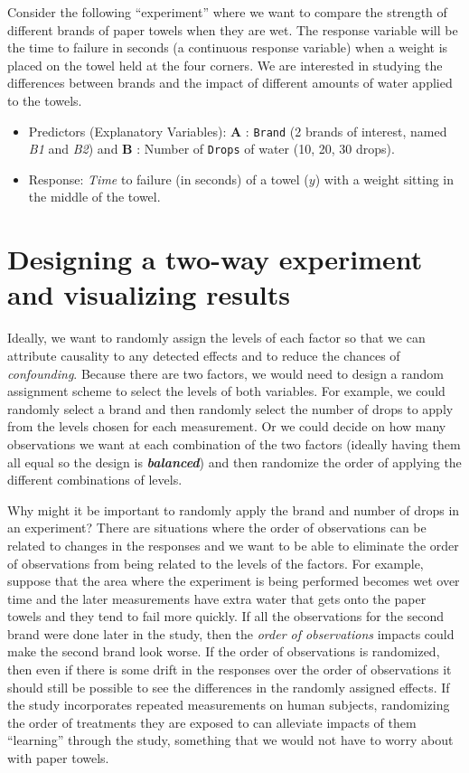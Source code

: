 \documentclass[]{book}
\theoremstyle{definition}
\theoremstyle{definition}
\theoremstyle{remark}
\begin{document}
Consider the following ``experiment'' where we want to compare the
strength of different brands of paper towels when they are wet. The
response variable will be the time to failure in seconds (a continuous
response variable) when a weight is placed on the towel held at the four
corners. We are interested in studying the differences between brands
and the impact of different amounts of water applied to the towels.

\begin{itemize}
\item
  Predictors (Explanatory Variables): \textbf{A} : \texttt{Brand} (2
  brands of interest, named \emph{B1} and \emph{B2}) and \textbf{B} :
  Number of \texttt{Drops} of water (10, 20, 30 drops).
\item
  Response: \emph{Time} to failure (in seconds) of a towel (\(y\)) with
  a weight sitting in the middle of the towel.
\end{itemize}

\section{Designing a two-way experiment and visualizing
results}\label{section4-2}

Ideally, we want to randomly assign the levels of each factor so that we
can attribute causality to any detected effects and to reduce the
chances of \emph{confounding}. Because there are two factors, we would
need to design a random assignment scheme to select the levels of both
variables. For example, we could randomly select a brand and then
randomly select the number of drops to apply from the levels chosen for
each measurement. Or we could decide on how many observations we want at
each combination of the two factors (ideally having them all equal so
the design is \textbf{\emph{balanced}}) and then randomize the order of
applying the different combinations of levels.

Why might it be important to randomly apply the brand and number of
drops in an experiment? There are situations where the order of
observations can be related to changes in the responses and we want to
be able to eliminate the order of observations from being related to the
levels of the factors. For example, suppose that the area where the
experiment is being performed becomes wet over time and the later
measurements have extra water that gets onto the paper towels and they
tend to fail more quickly. If all the observations for the second brand
were done later in the study, then the \emph{order of observations}
impacts could make the second brand look worse. If the order of
observations is randomized, then even if there is some drift in the
responses over the order of observations it should still be possible to
see the differences in the randomly assigned effects. If the study
incorporates repeated measurements on human subjects, randomizing the
order of treatments they are exposed to can alleviate impacts of them
``learning'' through the study, something that we would not have to
worry about with paper towels.
\end{document}
